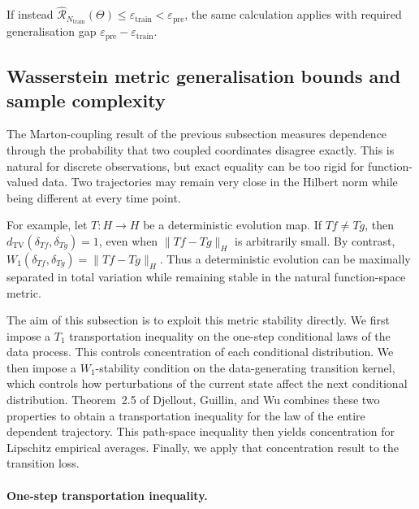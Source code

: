 \begin{remark}
If instead \(\widehat{\mathcal R}_{N_{\mathrm{train}}}(\Theta)\leqslant\varepsilon_{\mathrm{train}}<\varepsilon_{\mathrm{pre}}\), the same calculation applies with required generalisation gap \(\varepsilon_{\mathrm{pre}}-\varepsilon_{\mathrm{train}}\).
\end{remark}

\subsection{Wasserstein metric generalisation bounds and sample complexity}
\label{subsec:Wasserstein and metric dependence}

The Marton-coupling result of the previous subsection measures dependence through the probability that two coupled coordinates disagree exactly. This is natural for discrete observations, but exact equality can be too rigid for function-valued data. Two trajectories may remain very close in the Hilbert norm while being different at every time point.

For example, let \(T:H\to H\) be a deterministic evolution map. If \(Tf\neq Tg\), then \(d_{\mathrm{TV}}(\delta_{Tf},\delta_{Tg})=1\), even when \(\|Tf-Tg\|_H\) is arbitrarily small. By contrast, \(W_1(\delta_{Tf},\delta_{Tg})=\|Tf-Tg\|_H\). Thus a deterministic evolution can be maximally separated in total variation while remaining stable in the natural function-space metric.

The aim of this subsection is to exploit this metric stability directly. We first impose a \(T_1\) transportation inequality on the one-step conditional laws of the data process. This controls concentration of each conditional distribution. We then impose a \(W_1\)-stability condition on the data-generating transition kernel, which controls how perturbations of the current state affect the next conditional distribution. Theorem~2.5 of Djellout, Guillin, and Wu \cite{DjelloutGuillinWu2004} combines these two properties to obtain a transportation inequality for the law of the entire dependent trajectory. This path-space inequality then yields concentration for Lipschitz empirical averages. Finally, we apply that concentration result to the transition loss.

\paragraph{One-step transportation inequality.}

